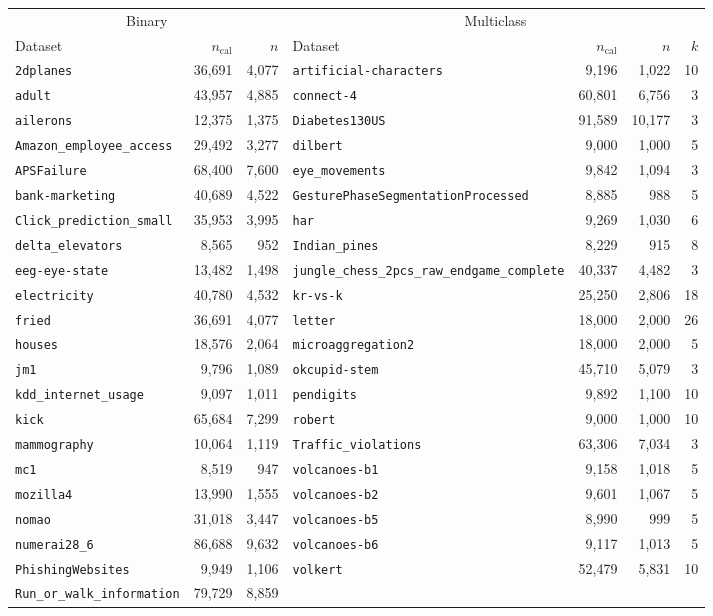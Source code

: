 \begin{tabular}{lrr @{\hskip 8mm} lrrr}
\toprule
\multicolumn{3}{c}{Binary} & \multicolumn{4}{c}{Multiclass} \\
\cmidrule(r{8mm}){1-3} \cmidrule(l){4-7}
Dataset & $n_{\mathrm{cal}}$ & $n$ & Dataset & $n_{\mathrm{cal}}$ & $n$ & $k$ \\
\midrule
\texttt{2dplanes} & 36,691 & 4,077 & \texttt{artificial-characters} & 9,196 & 1,022 & 10 \\
\texttt{adult} & 43,957 & 4,885 & \texttt{connect-4} & 60,801 & 6,756 & 3 \\
\texttt{ailerons} & 12,375 & 1,375 & \texttt{Diabetes130US} & 91,589 & 10,177 & 3 \\
\texttt{Amazon\_employee\_access} & 29,492 & 3,277 & \texttt{dilbert} & 9,000 & 1,000 & 5 \\
\texttt{APSFailure} & 68,400 & 7,600 & \texttt{eye\_movements} & 9,842 & 1,094 & 3 \\
\texttt{bank-marketing} & 40,689 & 4,522 & \texttt{GesturePhaseSegmentationProcessed} & 8,885 & 988 & 5 \\
\texttt{Click\_prediction\_small} & 35,953 & 3,995 & \texttt{har} & 9,269 & 1,030 & 6 \\
\texttt{delta\_elevators} & 8,565 & 952 & \texttt{Indian\_pines} & 8,229 & 915 & 8 \\
\texttt{eeg-eye-state} & 13,482 & 1,498 & \texttt{jungle\_chess\_2pcs\_raw\_endgame\_complete} & 40,337 & 4,482 & 3 \\
\texttt{electricity} & 40,780 & 4,532 & \texttt{kr-vs-k} & 25,250 & 2,806 & 18 \\
\texttt{fried} & 36,691 & 4,077 & \texttt{letter} & 18,000 & 2,000 & 26 \\
\texttt{houses} & 18,576 & 2,064 & \texttt{microaggregation2} & 18,000 & 2,000 & 5 \\
\texttt{jm1} & 9,796 & 1,089 & \texttt{okcupid-stem} & 45,710 & 5,079 & 3 \\
\texttt{kdd\_internet\_usage} & 9,097 & 1,011 & \texttt{pendigits} & 9,892 & 1,100 & 10 \\
\texttt{kick} & 65,684 & 7,299 & \texttt{robert} & 9,000 & 1,000 & 10 \\
\texttt{mammography} & 10,064 & 1,119 & \texttt{Traffic\_violations} & 63,306 & 7,034 & 3 \\
\texttt{mc1} & 8,519 & 947 & \texttt{volcanoes-b1} & 9,158 & 1,018 & 5 \\
\texttt{mozilla4} & 13,990 & 1,555 & \texttt{volcanoes-b2} & 9,601 & 1,067 & 5 \\
\texttt{nomao} & 31,018 & 3,447 & \texttt{volcanoes-b5} & 8,990 & 999 & 5 \\
\texttt{numerai28\_6} & 86,688 & 9,632 & \texttt{volcanoes-b6} & 9,117 & 1,013 & 5 \\
\texttt{PhishingWebsites} & 9,949 & 1,106 & \texttt{volkert} & 52,479 & 5,831 & 10 \\
\texttt{Run\_or\_walk\_information} & 79,729 & 8,859 &  &  &  &  \\
\bottomrule
\end{tabular}

